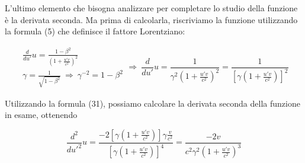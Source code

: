 \documentclass{article}
\begin{document}
\begin{center}
\end{center}

L'ultimo elemento che bisogna analizzare per completare
lo studio della funzione è la derivata seconda. Ma prima di
calcolarla, riscriviamo la funzione utilizzando la formula (5)
che definisce il fattore Lorentziano:

\begin{equation}
    \begin{aligned}
        \frac{d}{du'} u = \frac{1 - \beta^2}{\left(1 + \frac{u'v}{c^2}\right)^2} \\
        \gamma = \frac{1}{\sqrt{1 - \beta^2}}\ \Rightarrow\ \gamma^{-2} = 1 - \beta^2
    \end{aligned}
    \Rightarrow\ \frac{d}{du'} u = \frac{1}{\gamma^2\left(1 + \frac{u'v}{c^2}\right)^2} = \frac{1}{\left[\gamma \left(1 + \frac{u'v}{c^2}\right)\right]^2}
\end{equation}

Utilizzando la formula (31), possiamo calcolare la derivata
seconda della funzione in esame, ottenendo

\begin{equation}
    \frac{d^2}{du'^2} u = \frac{-2\left[\gamma \left(1 + \frac{u'v}{c^2}\right)\right] \gamma \frac{v}{c^2}}{\left[\gamma \left(1 + \frac{u'v}{c^2}\right)\right]^4} = \frac{-2v}{c^2\gamma^2 \left(1 + \frac{u'v}{c^2}\right)^3}
\end{equation}
\end{document}
